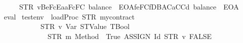 \begin{isabellebody}
\ \ \ \ \ \ \ {\isacharequal}{\kern0pt}\ STR\ {\isacharprime}{\kern0pt}{\isacharprime}{\kern0pt}v{}{\isacharbrackleft}{\kern0pt}{}{}{}{}{}{}{}{}{}{}{\isacharbrackright}{\kern0pt}{\isacharequal}{\kern0pt}{\isacharequal}{\kern0pt}{}{}{}{\isasymnewline}{}{}{}Be{}{}{}{}FcEa{}{}aF{}{}{}{}{}{}{}{}{}c{}{}F{}{}{}{}{}{}C{}{}{}{\isacharcolon}{\kern0pt}\ balance{\isacharequal}{\kern0pt}{\isacharequal}{\kern0pt}{}{}{}\ {\isacharminus}{\kern0pt}\ EOA{\isasymnewline}{}{}{}f{}e{}F{}{}{}{}{}C{}{}f{}DB{}AC{}{}{}{}{}a{}CC{}{}{}{}{}d{}{}{\isacharcolon}{\kern0pt}\ balance{\isacharequal}{\kern0pt}{\isacharequal}{\kern0pt}{}{}{}\ {\isacharminus}{\kern0pt}\ EOA{\isacharprime}{\kern0pt}{\isacharprime}{\kern0pt}{\isachardoublequoteclose}\isanewline
%
\isadelimproof
\ \ %
\endisadelimproof
%
\isatagproof
{}\isamarkupfalse%
\ eval%
\endisatagproof
{\isafoldproof}%
%
\isadelimproof
\isanewline
%
\endisadelimproof
\isanewline
{}\isamarkupfalse%
\ {\isachardoublequoteopen}testenv{}\ {\isasymequiv}\ loadProc\ {\isacharparenleft}{\kern0pt}STR\ {\isacharprime}{\kern0pt}{\isacharprime}{\kern0pt}mycontract{\isacharprime}{\kern0pt}{\isacharprime}{\kern0pt}{\isacharparenright}{\kern0pt}\isanewline
\ \ \ \ \ \ \ \ \ \ \ \ \ \ {\isacharparenleft}{\kern0pt}{\isacharbrackleft}{\kern0pt}{\isacharparenleft}{\kern0pt}STR\ {\isacharprime}{\kern0pt}{\isacharprime}{\kern0pt}v{}{\isacharprime}{\kern0pt}{\isacharprime}{\kern0pt}{\isacharcomma}{\kern0pt}\ Var\ {\isacharparenleft}{\kern0pt}STValue\ TBool{\isacharparenright}{\kern0pt}{\isacharparenright}{\kern0pt}{\isacharcomma}{\kern0pt}\isanewline
\ \ \ \ \ \ \ \ \ \ \ \ \ \ \ \ {\isacharparenleft}{\kern0pt}STR\ {\isacharprime}{\kern0pt}{\isacharprime}{\kern0pt}m{}{\isacharprime}{\kern0pt}{\isacharprime}{\kern0pt}{\isacharcomma}{\kern0pt}\ Method\ {\isacharparenleft}{\kern0pt}{\isacharbrackleft}{\kern0pt}{\isacharbrackright}{\kern0pt}{\isacharcomma}{\kern0pt}\ True{\isacharcomma}{\kern0pt}\ {\isacharparenleft}{\kern0pt}ASSIGN\ {\isacharparenleft}{\kern0pt}Id\ {\isacharparenleft}{\kern0pt}STR\ {\isacharprime}{\kern0pt}{\isacharprime}{\kern0pt}v{}{\isacharprime}{\kern0pt}{\isacharprime}{\kern0pt}{\isacharparenright}{\kern0pt}{\isacharparenright}{\kern0pt}\ FALSE{\isacharparenright}{\kern0pt}{\isacharparenright}{\kern0pt}{\isacharparenright}{\kern0pt}{\isacharbrackright}{\kern0pt}{\isacharcomma}{\kern0pt}\isanewline

\end{isabellebody}
